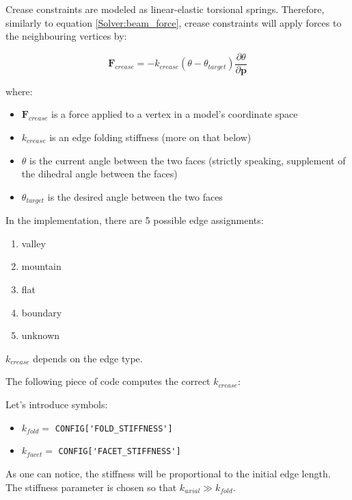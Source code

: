 Crease constraints are modeled as linear-elastic torsional springs.
Therefore, similarly to equation \eqref{Solver:beam_force}, crease constraints will apply forces to the neighbouring
vertices by:

\begin{equation} \label{Solver:crease_force}
	\pmb{F}_{crease} = -k_{crease}(\theta - \theta _{target})\frac{\partial \theta}{\partial \pmb{p}}
\end{equation}

where:

\begin{itemize}
	\item $\pmb{F}_{crease}$ is a force applied to a vertex in a model's coordinate space
	\item $k_{crease}$ is an edge folding stiffness (more on that below)
	\item $\theta$ is the current angle between the two faces (strictly speaking, supplement of the dihedral angle between the faces)
	\item $\theta _{target}$ is the desired angle between the two faces
\end{itemize}

In the implementation, there are 5 possible edge assignments:

\begin{enumerate}
	\item valley
	\item mountain
	\item flat
	\item boundary
	\item unknown
\end{enumerate}

$k_{crease}$ depends on the edge type.

\clearpage
The following piece of code computes the correct $k_{crease}$:



Let's introduce symbols:
\begin{itemize}
	\item $k_{fold} =$ \lstinline{CONFIG['FOLD_STIFFNESS']}
	\item $k_{facet} = $ \lstinline{CONFIG['FACET_STIFFNESS']}
\end{itemize}

As one can notice, the stiffness will be proportional to the initial edge length.
The stiffness parameter is chosen so that $k_{axial} \gg k_{fold}$.

